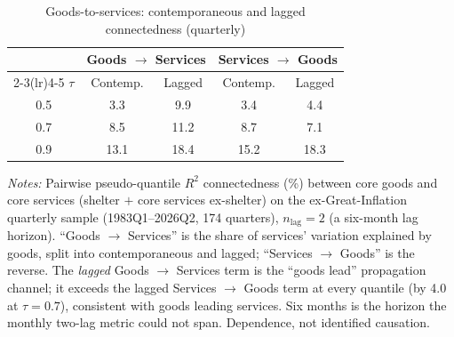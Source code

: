 \begin{table}[!ht]
\centering
\caption{Goods-to-services: contemporaneous and lagged connectedness (quarterly)}
\label{tab:h5q}
\setlength{\tabcolsep}{6pt}\footnotesize
\begin{threeparttable}
\begin{tabular}{c c c c c}
\toprule
 & \multicolumn{2}{c}{Goods $\to$ Services} & \multicolumn{2}{c}{Services $\to$ Goods} \\
\cmidrule(lr){2-3}\cmidrule(lr){4-5}
$\tau$ & Contemp. & Lagged & Contemp. & Lagged \\
\midrule
0.5 & 3.3 & 9.9 & 3.4 & 4.4 \\
0.7 & 8.5 & 11.2 & 8.7 & 7.1 \\
0.9 & 13.1 & 18.4 & 15.2 & 18.3 \\
\bottomrule
\end{tabular}
\begin{tablenotes}[flushleft]\footnotesize
\item \textit{Notes:} Pairwise pseudo-quantile $R^2$ connectedness (\%) between core goods and core services (shelter $+$ core services ex-shelter) on the ex-Great-Inflation quarterly sample (1983Q1--2026Q2, 174 quarters), $n_{\text{lag}}=2$ (a six-month lag horizon). ``Goods $\to$ Services'' is the share of services' variation explained by goods, split into contemporaneous and lagged; ``Services $\to$ Goods'' is the reverse. The \emph{lagged} Goods $\to$ Services term is the ``goods lead'' propagation channel; it exceeds the lagged Services $\to$ Goods term at every quantile (by 4.0 at $\tau=0.7$), consistent with goods leading services. Six months is the horizon the monthly two-lag metric could not span. Dependence, not identified causation.
\end{tablenotes}
\end{threeparttable}
\end{table}

